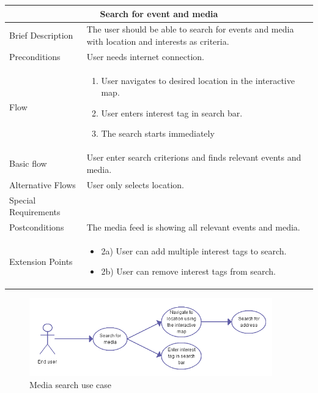 \begin{minipage}{\linewidth}
\begin{tabular}{|l|p{85mm}|}
  \hline
  \multicolumn{2}{|c|}{\cellcolor{gray!25} \textbf{Search for event and media}} \\
  \hline
  Brief Description & The user should be able to search for events and media with location and interests as criteria.\\
  Preconditions & User needs internet connection.\\
  Flow &
    \begin{enumerate}
      \item User navigates to desired location in the interactive map.
      \item User enters interest tag in search bar.
      \item The search starts immediately
    \end{enumerate} \\
  Basic flow & User enter search criterions and finds relevant events and media. \\
  Alternative Flows & User only selects location.\\
  Special Requirements & \\
  Postconditions & The media feed is showing all relevant events and media. \\
  Extension Points & 
    \begin{itemize}
      \item 2a) User can add multiple interest tags to search. 
      \item 2b) User can remove interest tags from search. 
    \end{itemize} \\
  \hline
\end{tabular}
\end{minipage}

\begin{figure}[ht!]
\centering
\includegraphics[width=105mm]{./SystemRequirements/img/searchUC.png}
\caption{Media search use case \label{fig:SysReqUseCasesSearch}}
\end{figure}

